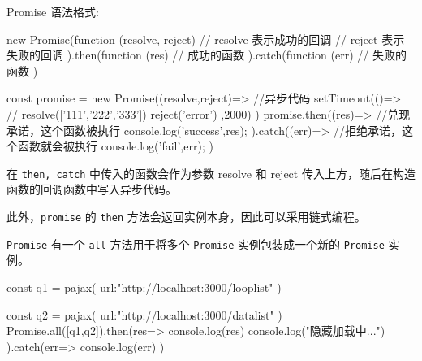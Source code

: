 Promise 语法格式:

\begin{JavaScript}
new Promise(function (resolve, reject) {
  // resolve 表示成功的回调
  // reject 表示失败的回调
}).then(function (res) {
  // 成功的函数
}).catch(function (err) {
  // 失败的函数
})
\end{JavaScript}

\begin{JavaScript}
const promise = new Promise((resolve,reject)=>{
    //异步代码
    setTimeout(()=>{
        // resolve(['111','222','333'])
        reject('error')
    },2000)
})
promise.then((res)=>{
    //兑现承诺，这个函数被执行
    console.log('success',res);
}).catch((err)=>{
    //拒绝承诺，这个函数就会被执行
    console.log('fail',err);
})
\end{JavaScript}

在 \texttt{then, catch} 中传入的函数会作为参数 resolve 和 reject 传入上方，随后在构造函数的回调函数中写入异步代码。

此外，\texttt{promise} 的 \texttt{then} 方法会返回实例本身，因此可以采用链式编程。

\texttt{Promise} 有一个 \texttt{all} 方法用于将多个 \texttt{Promise} 实例包装成一个新的 \texttt{Promise} 实例。

\begin{JavaScript}
const q1 = pajax({
    url:"http://localhost:3000/looplist"
})

const q2 = pajax({
    url:"http://localhost:3000/datalist"
})
Promise.all([q1,q2]).then(res=>{
    console.log(res)
    console.log("隐藏加载中...")
}).catch(err=>{
    console.log(err)
})
\end{JavaScript}